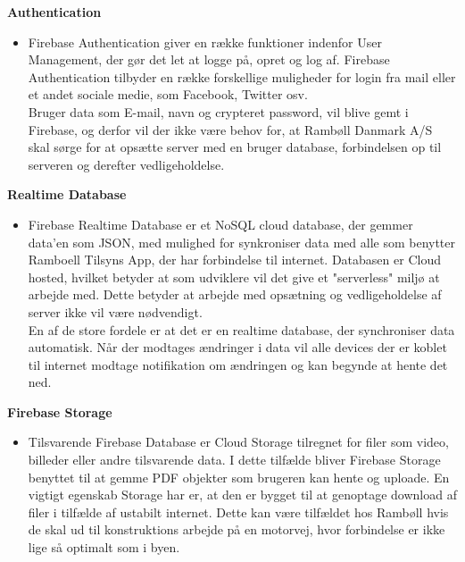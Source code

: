 \textbf{Authentication\cite{FirebaseAuth}}
\begin{itemize}[-]
	\itemsep 0.3em 
	\item[] Firebase Authentication giver en række funktioner indenfor User Management, der gør det let at logge på, opret og log af. Firebase Authentication tilbyder en række forskellige muligheder for login fra mail eller et andet sociale medie, som Facebook, Twitter osv. \\
	Bruger data som E-mail, navn og crypteret password, vil blive gemt i Firebase, og derfor vil der ikke være behov for, at Rambøll Danmark A/S skal sørge for at opsætte server med en bruger database, forbindelsen op til serveren og derefter vedligeholdelse. 
	
\end{itemize}	
\textbf{Realtime Database\cite{FirebaseRealtimeDB}}
\begin{itemize}[-]
	\itemsep 0.3em 
	\item[]  Firebase Realtime Database er et NoSQL cloud database, der gemmer data'en som JSON\cite{JSON}, med mulighed for synkroniser data med alle som benytter Ramboell Tilsyns App, der har forbindelse til internet. Databasen er Cloud hosted, hvilket betyder at som udviklere vil det give et "serverless" miljø at arbejde med. Dette betyder at arbejde med opsætning og vedligeholdelse af server ikke vil være nødvendigt. \\
	En af de store fordele er at det er en realtime database, der synchroniser data automatisk. Når der modtages ændringer i data vil alle devices der er koblet til internet modtage notifikation om ændringen og kan begynde at hente det ned. 
\end{itemize}
\textbf{Firebase Storage\cite{FirebaseStorage}}
\begin{itemize}[-]
	\itemsep 0.3em 
	\item[] Tilsvarende Firebase Database er Cloud Storage tilregnet for filer som video, billeder eller andre tilsvarende data. I dette tilfælde bliver Firebase Storage benyttet til at gemme PDF objekter som brugeren kan hente og uploade. En vigtigt egenskab Storage har er, at den er bygget til at genoptage download af filer i tilfælde af ustabilt internet. Dette kan være tilfældet hos Rambøll hvis de skal ud til konstruktions arbejde på en motorvej, hvor forbindelse er ikke lige så optimalt som i byen. 
\end{itemize}


\clearpage